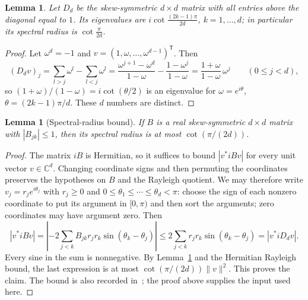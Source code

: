 \documentclass[11pt]{amsart}
\newtheorem{lemma}[theorem]{Lemma}
\theoremstyle{remark}
\numberwithin{equation}{section}
\newcommand{\T}{\mathsf{T}}
\begin{document}
\begin{lemma}\label{lem:Dd}
Let $D_d$ be the skew-symmetric $d\times d$ matrix with all entries above the diagonal equal to $1$. Its eigenvalues are $i\cot\frac{(2k-1)\pi}{2d}$, $k=1,\dots,d$; in particular its spectral radius is $\cot\frac{\pi}{2d}$.
\end{lemma}

\begin{proof}
Let $\omega^d=-1$ and $v=(1,\omega,\dots,\omega^{d-1})^\T$. Then
\[
(D_dv)_j=\sum_{l>j}\omega^{l}-\sum_{l<j}\omega^{l}=\frac{\omega^{j+1}-\omega^d}{1-\omega}-\frac{1-\omega^j}{1-\omega}=\frac{1+\omega}{1-\omega}\,\omega^j\qquad(0\le j<d),
\]
so $(1+\omega)/(1-\omega)=i\cot(\theta/2)$ is an eigenvalue for $\omega=e^{i\theta}$, $\theta=(2k-1)\pi/d$. These $d$ numbers are distinct.
\end{proof}

\begin{lemma}[Spectral-radius bound]\label{lem:radiusbound}
If $B$ is a real skew-symmetric $d\times d$ matrix with $|B_{jk}|\le1$, then its spectral radius is at most $\cot(\pi/(2d))$.
\end{lemma}

\begin{proof}
The matrix $iB$ is Hermitian, so it suffices to bound $|v^*iBv|$ for every unit vector $v\in\mathbb C^d$. Changing coordinate signs and then permuting the coordinates preserves the hypotheses on $B$ and the Rayleigh quotient. We may therefore write $v_j=r_je^{i\theta_j}$ with $r_j\ge0$ and $0\le\theta_1\le\cdots\le\theta_d<\pi$: choose the sign of each nonzero coordinate to put its argument in $[0,\pi)$ and then sort the arguments; zero coordinates may have argument zero. Then
\[
|v^*iBv|=\left|-2\sum_{j<k}B_{jk}r_jr_k\sin(\theta_k-\theta_j)\right|
\le 2\sum_{j<k}r_jr_k\sin(\theta_k-\theta_j)=|v^*iD_dv|.
\]
Every sine in the sum is nonnegative. By Lemma~\ref{lem:Dd} and the Hermitian Rayleigh bound, the last expression is at most $\cot(\pi/(2d))\|v\|^2$. This proves the claim. The bound is also recorded in~\cite[Lemma~12]{GKLV}; the proof above supplies the input used here.
\end{proof}
\end{document}
